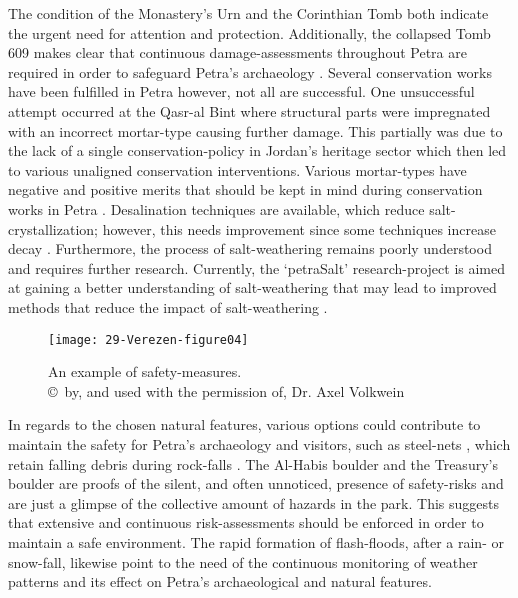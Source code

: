 The condition of the Monastery’s Urn and the Corinthian Tomb both indicate the urgent need for attention and protection.
Additionally, the collapsed Tomb 609 makes clear that continuous damage-assessments throughout Petra are
required in order to safeguard Petra’s archaeology \parencite[672]{heinrichs2008}.
Several conservation works have been fulfilled in Petra however, not all are successful.
One unsuccessful attempt occurred at the Qasr-al Bint where structural parts were impregnated with
an incorrect mortar-type causing further damage.
This partially was due to the lack of a single conservation-policy in Jordan’s heritage sector which then led to
various unaligned conservation interventions.
Various mortar-types have negative and positive merits that should be kept in mind during
conservation works in Petra \parencite[926--932]{alsaad2001}.
Desalination techniques are available, which reduce salt-crystallization; however,
this needs improvement since some techniques increase decay \parencites[561--563]{matyscak2014}[1915--1916]{rörigdalgaard2015}[1125--1129]{young2003}.
Furthermore, the process of salt-weathering remains poorly understood and requires further research.
Currently, the ‘petraSalt’ research-project is aimed at gaining a better understanding of salt-weathering that may lead to
improved methods that reduce the impact of salt-weathering \parencite[347--348]{heinrichs2013a}.

\begin{figure}[!htb]
	\texttt{[image: 29-Verezen-figure04]}
	\caption{An example of safety-measures.
		{\normalfont\scriptsize \\ \copyright\ by, and used with the permission of, Dr. Axel Volkwein
	}}
	\label{fig:29-Verezen-figure04}
\end{figure}

In regards to the chosen natural features, various options could contribute to maintain the safety for Petra’s archaeology and visitors,
such as steel-nets , which retain falling debris during rock-falls \parencite[2638]{volkwein2011}.
The Al-Habis boulder and the Treasury’s boulder  are proofs of the silent, and often unnoticed,
presence of safety-risks and are just a glimpse of the collective amount of hazards in the park.
This suggests that extensive and continuous risk-assessments should be enforced in order to maintain a safe environment.
The rapid formation of flash-floods, after a rain- or snow-fall, likewise point to the need of the continuous monitoring of
weather patterns and its effect on Petra’s archaeological and natural features.

